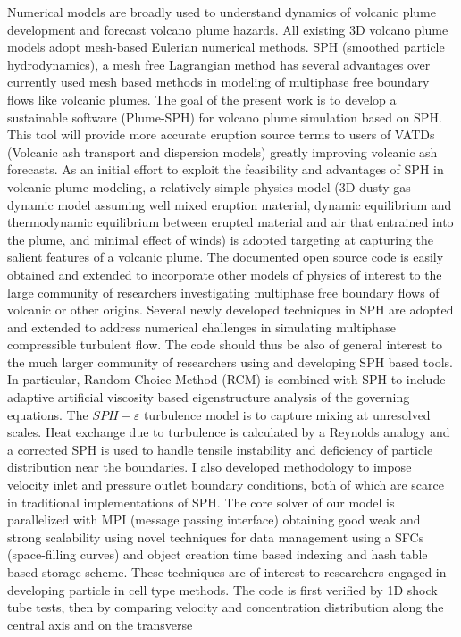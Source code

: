 Numerical models are broadly used to understand dynamics of volcanic plume development and forecast volcano plume hazards. All existing 3D volcano plume models adopt mesh-based Eulerian numerical methods. 
SPH (smoothed particle hydrodynamics), a mesh free Lagrangian method has several advantages over currently used mesh based methods in modeling of multiphase free boundary flows like volcanic plumes. The goal of the present work is to develop a sustainable software (Plume-SPH) for volcano plume simulation based on SPH.
This tool will provide more accurate eruption source terms to users of VATDs (Volcanic ash transport and dispersion models) greatly improving volcanic ash forecasts.
As an initial effort to exploit the feasibility and advantages of SPH in volcanic plume modeling, a relatively simple physics model (3D dusty-gas dynamic model assuming well mixed eruption material, dynamic equilibrium and thermodynamic equilibrium between erupted material and air that entrained into the plume, and minimal effect of winds) is adopted targeting at capturing the salient features of a volcanic plume. The documented open source code is easily obtained and extended to incorporate other models of physics of interest to the large community of researchers investigating multiphase free boundary flows of volcanic or other origins. 
Several newly developed techniques in SPH are adopted and extended to address numerical challenges in simulating multiphase compressible turbulent flow. The code should thus be also of general interest to the much larger community of researchers using and developing SPH based tools. In particular, Random Choice Method (RCM) is combined with SPH to include adaptive artificial viscosity based eigenstructure analysis of the governing equations. The $SPH-\varepsilon$ turbulence model is to capture mixing at unresolved scales. Heat exchange due to turbulence is calculated by a Reynolds analogy and a corrected SPH is used to handle tensile instability and deficiency of particle distribution near the boundaries. I also developed methodology to impose velocity inlet and pressure outlet boundary conditions, both of which are scarce in traditional implementations of SPH.
The core solver of our model is parallelized with MPI (message passing interface) obtaining good weak and strong scalability using novel techniques for data management using a SFCs (space-filling curves) and object creation time based indexing and hash table based storage scheme. These techniques are of interest to researchers engaged in developing particle in cell type methods. The code is first verified by 1D shock tube tests, then by comparing velocity and concentration distribution along the central axis and on the transverse

